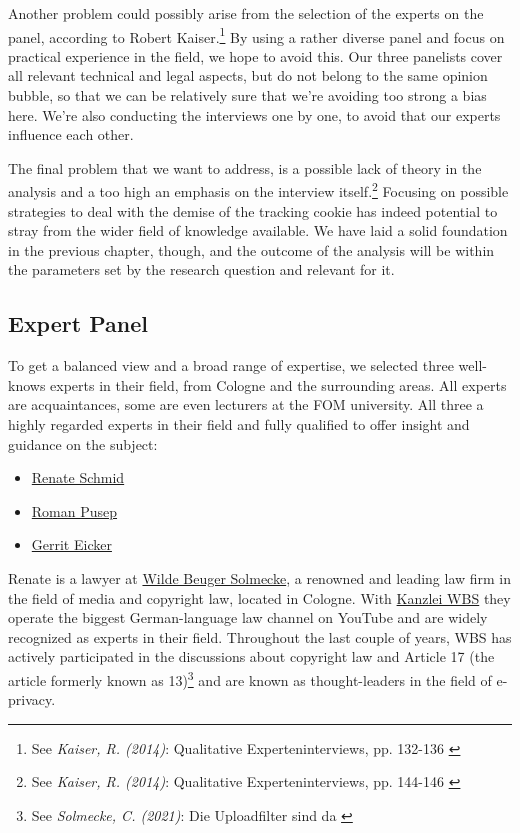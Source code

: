 Another problem could possibly arise from the selection of the experts on the panel, according to Robert Kaiser.\footnote{See \textit{Kaiser, R. (2014)}: Qualitative Experteninterviews, pp. 132-136 \cite{expertInterviews}} By using a rather diverse panel and focus on practical experience in the field, we hope to avoid this. Our three panelists cover all relevant technical and legal aspects, but do not belong to the same opinion bubble, so that we can be relatively sure that we're avoiding too strong a bias here. We're also conducting the interviews one by one, to avoid that our experts influence each other.

The final problem that we want to address, is a possible lack of theory in the analysis and a too high an emphasis on the interview itself.\footnote{See \textit{Kaiser, R. (2014)}: Qualitative Experteninterviews, pp. 144-146 \cite{expertInterviews}} Focusing on possible strategies to deal with the demise of the tracking cookie has indeed potential to stray from the wider field of knowledge available. We have laid a solid foundation in the previous chapter, though, and the outcome of the analysis will be within the parameters set by the research question and relevant for it.

\subsection{Expert Panel}

To get a balanced view and a broad range of expertise, we selected three well-knows experts in their field, from Cologne and the surrounding areas. All experts are acquaintances, some are even lecturers at the FOM university. All three a highly regarded experts in their field and fully qualified to offer insight and guidance on the subject:

\begin{itemize}
 \item \href{https://www.linkedin.com/in/renate-schmid-535233113/}{Renate Schmid}
 \item \href{https://www.linkedin.com/in/roman-pusep-36b33374/}{Roman Pusep}
 \item \href{https://www.linkedin.com/in/eicker/}{Gerrit Eicker}
\end{itemize}

Renate is a lawyer at \href{https://www.wbs-law.de/}{Wilde Beuger Solmecke}, a renowned and leading law firm in the field of media and copyright law, located in Cologne. With \href{https://www.youtube.com/user/KanzleiWBS}{Kanzlei WBS} they operate the biggest German-language law channel on YouTube and are widely recognized as experts in their field. Throughout the last couple of years, WBS has actively participated in the discussions about copyright law and Article 17 (the article formerly known as 13)\footnote{See \textit{Solmecke, C. (2021)}: Die Uploadfilter sind da \cite{article17}} and are known as thought-leaders in the field of e-privacy.

